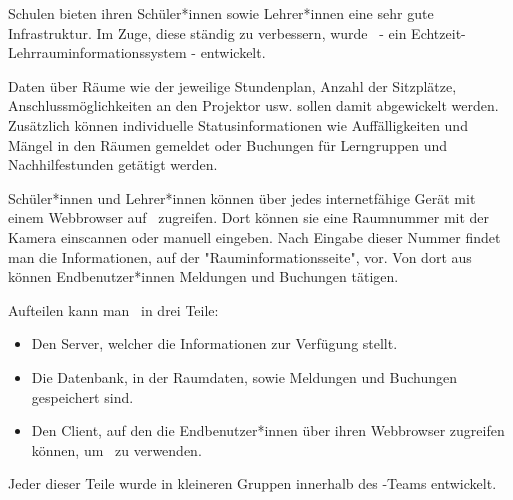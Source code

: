 
Schulen bieten ihren Schüler*innen sowie Lehrer*innen eine sehr gute Infrastruktur. Im Zuge, diese ständig zu verbessern, wurde \ZELIA\ - ein Echtzeit-Lehr\-raum\-informations\-system - entwickelt. 

Daten über Räume wie der jeweilige Stundenplan, Anzahl der Sitzplätze, Anschlussmöglichkeiten an den Projektor usw. sollen damit abgewickelt werden. Zusätzlich können individuelle Statusinformationen wie Auffälligkeiten und Mängel in den Räumen gemeldet oder Buchungen für Lerngruppen und Nachhilfestunden getätigt werden.

Schüler*innen und Lehrer*innen können über jedes internetfähige Gerät mit einem Webbrowser auf \ZELIA\ zugreifen. Dort können sie eine Raumnummer mit der Kamera einscannen oder manuell eingeben. Nach Eingabe dieser Nummer findet man die Informationen, auf der "Rauminformationsseite", vor. Von dort aus können Endbenutzer*innen Meldungen und Buchungen tätigen.

Aufteilen kann man \ZELIA\ in drei Teile:
\begin{itemize}
    \item Den Server, welcher die Informationen zur Verfügung stellt.
    \item Die Datenbank, in der Raumdaten, sowie Meldungen und Buchungen gespeichert sind.
    \item Den Client, auf den die Endbenutzer*innen über ihren Webbrowser zugreifen können, um \ZELIA\ zu verwenden.
\end{itemize}

Jeder dieser Teile wurde in kleineren Gruppen innerhalb des \ZELIA-Teams entwickelt.
